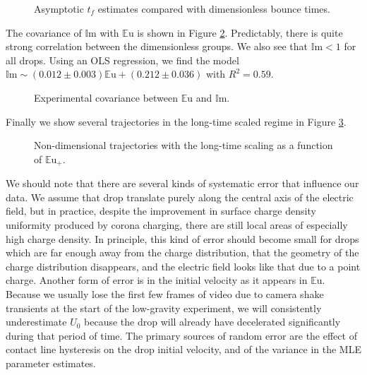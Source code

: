 \documentclass[12pt,a4paper,oneside]{book}
\begin{document}
\begin{figure}[htb]
    \centering
    
    \caption{Asymptotic $t_f$ estimates compared with dimensionless bounce times.\label{fig:times}}
\end{figure}

The covariance of $\mathbb{I}\mbox{m}$ with $\mathbb{E}\mbox{u}$ is shown in Figure \ref{fig:dnumbs}. Predictably, there is quite strong correlation between the dimensionless groups. We also see that $\mathbb{I}\mbox{m} < 1$ for all drops. Using an OLS regression, we find the model $\mathbb{I}\mbox{m} \sim (0.012 \pm 0.003) \mathbb{E}\mbox{u} + (0.212 \pm 0.036) $ with $R^2 =0.59$.
\begin{figure}[htb]
    \centering
    
    \caption{Experimental covariance between $\mathbb{E}\mbox{u}$ and $\mathbb{I}\mbox{m}$.\label{fig:dnumbs}}
\end{figure}

Finally we show several trajectories in the long-time scaled regime in Figure \ref{fig:series_l_ds}.
\begin{figure}[htb]
    \centering
    
    \caption{Non-dimensional trajectories with the long-time scaling as a function of ${\mathbb{E}\mbox{u}}_+$.\label{fig:series_l_ds}}
\end{figure}
We should note that there are several kinds of systematic error that influence our data. We assume that drop translate purely along the central axis of the electric field, but in practice, despite the improvement in surface charge density uniformity produced by corona charging, there are still local areas of especially high charge density. In principle, this kind of error should become small for drops which are far enough away from the charge distribution, that the geometry of the charge distribution disappears, and the electric field looks like that due to a point charge. Another form of error is in the initial velocity as it appears in $\mathbb{E}\mbox{u}$. Because we usually lose the first few frames of video due to camera shake transients at the start of the low-gravity experiment, we will consistently underestimate $U_0$ because the drop will already have decelerated significantly during that period of time. The primary sources of random error are the effect of contact line hysteresis on the drop initial velocity, and of the variance in the MLE parameter estimates.

\end{document}
